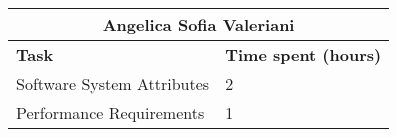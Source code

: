 \begin{table}[h]
  \center
  \begin{tabular}{l|l}
    \multicolumn{2}{c}{\textbf{Angelica Sofia Valeriani}} \\
    \hline
    \textbf{Task} & \textbf{Time spent (hours)}\\
    \hline
    Software System Attributes & 2 \\
    Performance Requirements & 1 \\
  \end{tabular}
\end{table}